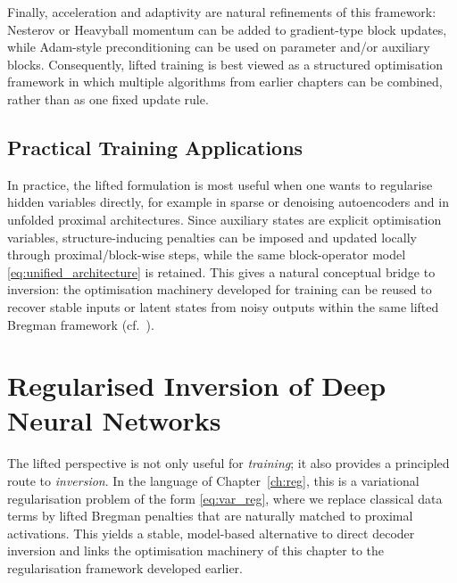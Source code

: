 Finally, acceleration and adaptivity are natural refinements of this framework: Nesterov or Heavyball momentum can be added to gradient-type block updates, while Adam-style preconditioning can be used on parameter and/or auxiliary blocks. Consequently, lifted training is best viewed as a structured optimisation framework in which multiple algorithms from earlier chapters can be combined, rather than as one fixed update rule.

\subsection{Practical Training Applications}
In practice, the lifted formulation is most useful when one wants to regularise hidden variables directly, for example in sparse or denoising autoencoders and in unfolded proximal architectures. Since auxiliary states are explicit optimisation variables, structure-inducing penalties can be imposed and updated locally through proximal/block-wise steps, while the same block-operator model \eqref{eq:unified_architecture} is retained. This gives a natural conceptual bridge to inversion: the optimisation machinery developed for training can be reused to recover stable inputs or latent states from noisy outputs within the same lifted Bregman framework (cf.\ \cite{wang2025unified}).

\section{Regularised Inversion of Deep Neural Networks}
The lifted perspective is not only useful for \emph{training}; it also provides a principled route to \emph{inversion}. In the language of Chapter~\ref{ch:reg}, this is a variational regularisation problem of the form \eqref{eq:var_reg}, where we replace classical data terms by lifted Bregman penalties that are naturally matched to proximal activations. This yields a stable, model-based alternative to direct decoder inversion and links the optimisation machinery of this chapter to the regularisation framework developed earlier.

